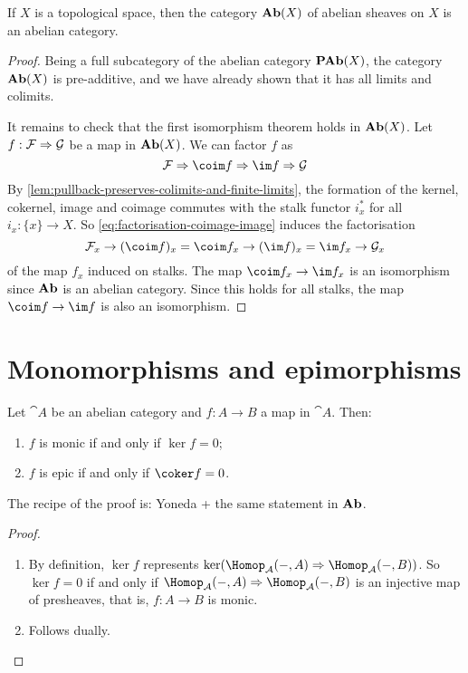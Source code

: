 \begin{prop}
If \(X\) is a topological space, then the category \(\operatorname{\mathbf{Ab}}(X)\) of abelian sheaves on \(X\) is an abelian category.
\end{prop}
\begin{proof}
Being a full subcategory of the abelian category \(\operatorname{\mathbf{PAb}}(X)\), the category \(\operatorname{\mathbf{Ab}}(X)\) is pre-additive, and we have already shown that it has all limits and colimits.

It remains to check that the first isomorphism theorem holds in \(\operatorname{\mathbf{Ab}}(X)\).
Let \(f\colon\mathcal F\To\mathcal G\) be a map in \(\operatorname{\mathbf{Ab}}(X)\).
We can factor \(f\) as
\begin{equation}\label{eq:factorisation-coimage-image}
  \mathcal F \To \coim f \To \im f \To \mathcal G
\end{equation}
By \cref{lem:pullback-preserves-colimits-and-finite-limits}, the formation of the kernel, cokernel, image and coimage commutes with the stalk functor \(i_x^*\) for all \(i_x\colon\{x\}\to X\).
So \cref{eq:factorisation-coimage-image} induces the factorisation
\[ \mathcal F_x \to (\coim f)_x = \coim f_x \to (\im f)_x = \im f_x \to \mathcal G_x \]
of the map \(f_x\) induced on stalks.
The map \(\coim f_x\to\im f_x\) is an isomorphism since \(\mathbf{Ab}\) is an abelian category.
Since this holds for all stalks, the map \(\coim f\to\im f\) is also an isomorphism.
\end{proof}

\section{Monomorphisms and epimorphisms}

\begin{lem}
Let \(\cat A\) be an abelian category and \(f\colon A\to B\) a map in \(\cat A\).
Then:
\begin{enumerate}
\item \(f\) is monic if and only if \(\ker f = 0\);
\item \(f\) is epic if and only if \(\coker f = 0\).
\end{enumerate}
\end{lem}

The recipe of the proof is: Yoneda + the same statement in \(\mathbf{Ab}\).

\begin{proof}
\begin{enumerate}
\item
  By definition, \(\ker f\) represents \(\ker(\Hom[\cat A](-,A)\To\Hom[\cat A](-,B))\).
  So \(\ker f = 0\) if and only if \(\Hom[\cat A](-,A)\To\Hom[\cat A](-,B)\) is an injective map of presheaves, that is, \(f\colon A\to B\) is monic.
\item Follows dually. \qedhere
\end{enumerate}
\end{proof}

